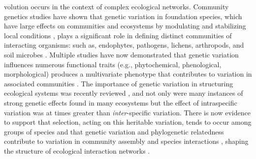 \documentclass[11pt,twocolumn,twoside,lineno]{pnas-new}
\begin{document}


\maketitle \thispagestyle{firststyle}





volution occurs in the context of complex ecological
networks. Community genetics studies have shown that genetic variation
in foundation species, which have large effects on communities and
ecosystems by modulating and stabilizing local conditions
\cite{Ellison2005}, plays a significant role in defining distinct
communities of interacting organisms: such as, endophytes, pathogens,
lichens, arthropods, and soil microbes \cite{Busby2015, Barbour2009c,
  Lamit2015c}. Multiple studies have now demonstrated that genetic
variation influences numerous functional traits (e.g., phytochemical,
phenological, morphological) produces a multivariate phenotype
\cite{holeski2012} that contributes to variation in associated
communities \cite{Bailey2009a}. The importance of genetic variation in
structuring ecological systems was recently reviewed
\cite{DesRoches2018TheVariation}, and not only were many instances of
strong genetic effects found in many ecosystems but the effect of
intraspecific variation was at times greater than
\textit{inter}-specific variation. There is now evidence to support
that selection, acting on this heritable variation, tends to occur
among groups of species \cite{Wade2007TheCommunities} and that genetic
variation and phylogenetic relatedness contribute to variation in
community assembly \cite{Crutsinger2016} and species interactions
\cite{Whitham2006a, Bailey2009a, Moya-Larano2011}, shaping the
structure of ecological interaction networks \cite{Rezende2007,
  Guimaraes2007InteractionNetworks, Gomez2009LocalMosaic}.
\end{document}
